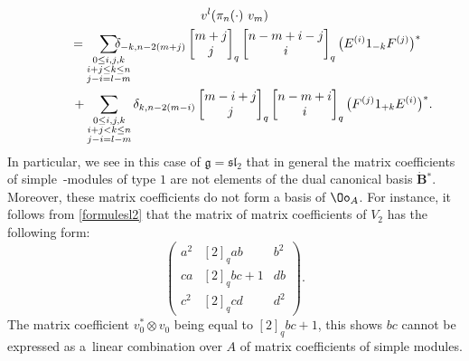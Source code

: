 \begin{gather}
v^l(\pi_n( \cdot) \ v_m)\nonumber\\
\qquad= \sum_{\substack{0\leq i,j,k\\ i+j\leq k\leq n\\j-i=l-m}} \hspace*{-0.5cm}\delta_{-k,n-2(m+j)} \left[\begin{matrix} m+j \\ j \end{matrix}\right]_{q} \left[\begin{matrix}n-m+i-j \\ i \end{matrix}\right]_{q}\big(E^{(i)}1_{-k}F^{(j)}\big)^*\nonumber\\
\phantom{\qquad=}{} + \sum_{\substack{0\leq i,j,k\\ i+j< k\leq n
\\j-i=l-m}}\delta_{k,n-2(m-i)} \left[\begin{matrix} m-i+j \\ j \end{matrix}\right]_{q} \left[\begin{matrix} n-m+i \\ i \end{matrix}\right]_{q}\big(F^{(j)}1_{+k}E^{(i)}\big)^*.\label{formulesl2}
\end{gather}
In particular, we see in this case of $\mathfrak{g}={\mathfrak{sl}_2}$ that in general the matrix coefficients of simple~-modules of type $1$ are not elements of the dual canonical basis $\dot{\mathbf{B}} {}^*$. Moreover, these matrix coefficients do not form a basis of $\Oo_A$. For instance, it follows from \eqref{formulesl2} that the matrix of matrix coefficients of $V_2$ has the following form:
\begin{equation}\label{matrixcoefV2}
\begin{pmatrix}a^2 & [2]_qab & b^2 \\ ca & [2]_qbc +1 & db \\ c^2 & [2]_q cd & d^2 \end{pmatrix}.
\end{equation}
The matrix coefficient $v_0^* \otimes v_0$ being equal to $[2]_qbc +1$, this shows $bc$ cannot be expressed as a~linear combination over $A$ of matrix coefficients of simple modules.

